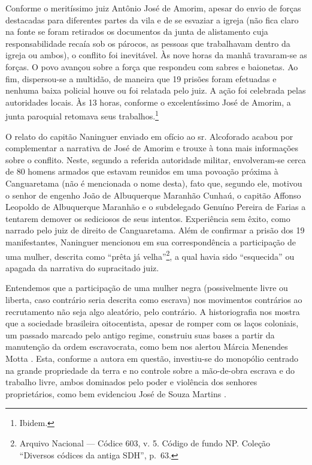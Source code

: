 \begin{refsection}
Conforme o meritíssimo juiz Antônio José de Amorim, apesar do envio de forças destacadas para diferentes partes da vila e de se esvaziar a igreja (não fica claro na fonte se foram retirados os documentos da junta de alistamento cuja responsabilidade recaía sob os párocos, as pessoas que trabalhavam dentro da igreja ou ambos), o conflito foi inevitável. Às nove horas da manhã travaram-se as forças. O povo avançou sobre a força que respondeu com sabres e baionetas. Ao fim, dispersou-se a multidão, de maneira que 19 prisões foram efetuadas e nenhuma baixa policial houve ou foi relatada pelo juiz. A ação foi celebrada pelas autoridades locais. Às 13 horas, conforme o excelentíssimo José de Amorim, a junta paroquial retomava seus trabalhos.\footnote{Ibidem.}

O relato do capitão Naninguer enviado em ofício ao sr. Alcoforado acabou por complementar a narrativa de José de Amorim e trouxe à tona mais informações sobre o conflito. Neste, segundo a referida autoridade militar, envolveram-se cerca de 80 homens armados que estavam reunidos em uma povoação próxima à Canguaretama (não é mencionada o nome desta), fato que, segundo ele, motivou o senhor de engenho João de Albuquerque Maranhão Cunhaú, o capitão Affonso Leopoldo de Albuquerque Maranhão e o subdelegado Genuíno Pereira de Farias a tentarem demover os sediciosos de seus intentos. Experiência sem êxito, como narrado pelo juiz de direito de Canguaretama. Além de confirmar a prisão dos 19 manifestantes, Naninguer mencionou em sua correspondência a participação de uma mulher, descrita como “prêta já velha”\footnote{Arquivo Nacional --- Códice 603, v. 5. Código de fundo NP. Coleção “Diversos códices da antiga SDH”, p.~63.}, a qual havia sido “esquecida” ou apagada da narrativa do supracitado juiz.  

Entendemos que a participação de uma mulher negra (possivelmente livre ou liberta, caso contrário seria descrita como escrava) nos movimentos contrários ao recrutamento não seja algo aleatório, pelo contrário. A historiografia nos mostra que a sociedade brasileira oitocentista, apesar de romper com os laços coloniais, um passado marcado pelo antigo regime, construiu suas bases a partir da manutenção da ordem escravocrata, como bem nos alertou Márcia Menendes Motta \citeyear{Motta1998NasFronteiras}. Esta, conforme a autora em questão, investiu-se do monopólio centrado na grande propriedade da terra e no controle sobre a mão-de-obra escrava e do trabalho livre, ambos dominados pelo poder e violência dos senhores proprietários, como bem evidenciou José de Souza Martins \citeyear{Martins2010}.


\end{refsection}
